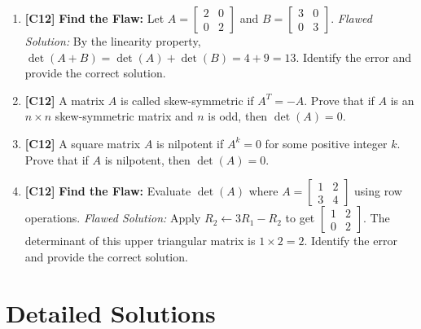 \documentclass[11pt]{article}
\begin{document}
\begin{enumerate}
    \item \textbf{[C12]} \textbf{Find the Flaw:} Let $A = \begin{bmatrix} 2 & 0 \\ 0 & 2 \end{bmatrix}$ and $B = \begin{bmatrix} 3 & 0 \\ 0 & 3 \end{bmatrix}$. 
    \textit{Flawed Solution:} By the linearity property, $\det(A+B) = \det(A) + \det(B) = 4 + 9 = 13$. Identify the error and provide the correct solution.

    \item \textbf{[C12]} A matrix $A$ is called skew-symmetric if $A^T = -A$. Prove that if $A$ is an $n \times n$ skew-symmetric matrix and $n$ is odd, then $\det(A) = 0$.

    \item \textbf{[C12]} A square matrix $A$ is nilpotent if $A^k = 0$ for some positive integer $k$. Prove that if $A$ is nilpotent, then $\det(A) = 0$.

    \item \textbf{[C12]} \textbf{Find the Flaw:} Evaluate $\det(A)$ where $A = \begin{bmatrix} 1 & 2 \\ 3 & 4 \end{bmatrix}$ using row operations.
    \textit{Flawed Solution:} Apply $R_2 \leftarrow 3R_1 - R_2$ to get $\begin{bmatrix} 1 & 2 \\ 0 & 2 \end{bmatrix}$. The determinant of this upper triangular matrix is $1 \times 2 = 2$. Identify the error and provide the correct solution.

\end{enumerate}

\newpage

\section{Detailed Solutions}
\end{document}

